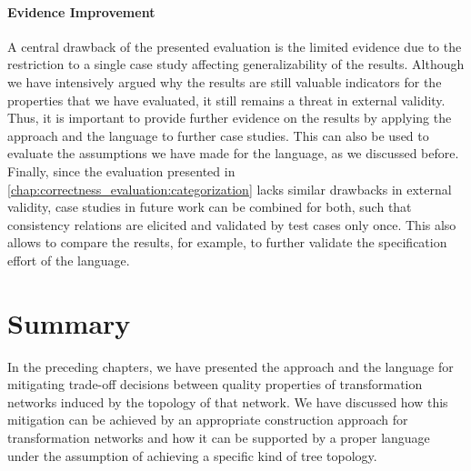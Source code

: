 

\paragraph{Evidence Improvement}
A central drawback of the presented evaluation is the limited evidence due to the restriction to a single case study affecting generalizability of the results.
Although we have intensively argued why the results are still valuable indicators for the properties that we have evaluated, it still remains a threat in external validity.
Thus, it is important to provide further evidence on the results by applying the approach and the language to further case studies.
This can also be used to evaluate the assumptions we have made for the language, as we discussed before.
Finally, since the evaluation presented in \autoref{chap:correctness_evaluation:categorization} lacks similar drawbacks in external validity, case studies in future work can be combined for both, such that consistency relations are elicited and validated by test cases only once.
This also allows to compare the results, for example, to further validate the specification effort of the \commonalities language.


\section{Summary}

In the preceding chapters, we have presented the \commonalities approach and the \commonalities language for mitigating trade-off decisions between quality properties of transformation networks induced by the topology of that network.
We have discussed how this mitigation can be achieved by an appropriate construction approach for transformation networks and how it can be supported by a proper language under the assumption of achieving a specific kind of tree topology.

